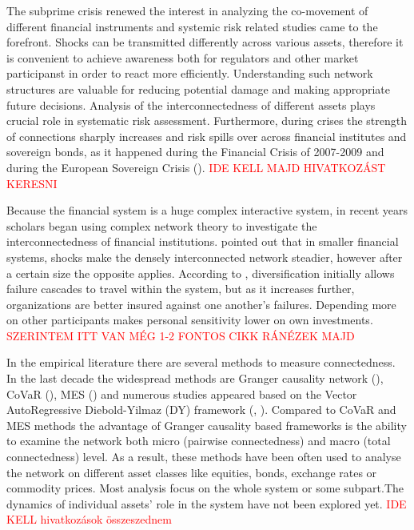 \documentclass[12pt,bibliography=totoc]{article}
\begin{document}
The subprime crisis renewed the interest in analyzing the co-movement of different financial instruments and systemic risk related studies came to the forefront. Shocks can be transmitted differently across various assets, therefore it is convenient to achieve awareness both for regulators and other market participanst in order to react more efficiently. Understanding such network structures are valuable for reducing potential damage and making appropriate future decisions. Analysis of the interconnectedness of different assets plays crucial role in systematic risk assessment. Furthermore, during crises the strength of connections sharply increases and risk spills over across financial institutes and sovereign bonds, as it happened during the Financial Crisis of 2007-2009 and during the European Sovereign Crisis (\cite{diebold2012better}). \textcolor{red}{IDE KELL MAJD HIVATKOZÁST KERESNI}

Because the financial system is a huge complex interactive system, in recent years scholars began using complex network theory to investigate the interconnectedness of financial institutions. \cite{acemoglu2015systemic} pointed out that in smaller financial systems, shocks make the densely interconnected network steadier, however after a certain size the opposite applies. According to \cite{elliott2014financial}, diversification initially allows failure cascades to travel within the system, but as it increases further, organizations are better insured against one another's failures. Depending more on other participants makes personal sensitivity lower on own investments. \textcolor{red}{SZERINTEM ITT VAN MÉG 1-2 FONTOS CIKK RÁNÉZEK MAJD}

In the empirical literature there are several methods to measure connectedness. In the last decade the widespread methods are Granger causality network (\cite{billio2012econometric}), CoVaR (\cite{adrian2008federal}), MES (\cite{acharya2012capital}) and numerous studies appeared based on the Vector AutoRegressive Diebold-Yilmaz (DY) framework (\cite{diebold2009measuring}, \cite{diebold2012better}). Compared to CoVaR and MES methods the advantage of Granger causality based frameworks is the ability to examine the network both micro (pairwise connectedness) and macro (total connectedness) level. As a result, these methods have been often used to analyse the network on different asset classes like equities, bonds, exchange rates or commodity prices. Most analysis focus on the whole system or some subpart.The dynamics of individual assets' role in the system have not been explored yet. \textcolor{red}{IDE KELL hivatkozások összeszednem}
\end{document}
